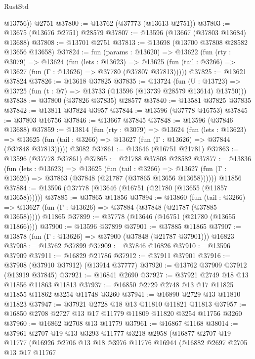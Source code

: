 \begin{lexlean}{RustStd}
\begin{coremodule}
        @13756))
    @2751
@37800 := @13762 (@37773 (@13613 @2751))
@37803 := @13675 (@13676 @2751) @28579
@37807 := @13596 (@13667 (@37803 @13684) @13688)
@37808 := @13701 @2751
@37813 := @13698 (@13700 @37808 @28582 @13656 @13658)
@37824 := fun (params : @13620) =>
  @13622
    (fun (rty : @3079) =>
    @13624
      (fun (lets : @13623) =>
      @13625 (fun (tail : @3266) => @13627 (fun (Γ : @13626) => @37780 (@37807 @37813)))))
@37825 := @13621 @37824
@37826 := @13618 @37825
@37835 := @13724
    (fun (U : @13723) => @13725 (fun (t : @7) => @13733 (@13596 (@13739 @28579 @13614) @13750)))
@37838 := @37800 (@37826 @37835) @28577
@37840 := @13581 @37825 @37835
@37842 := @13811 @37824 @3957
@37844 := @13596 (@37778 @16753)
@37845 := @37803 @16756
@37846 := @13667 @37845
@37848 := @13596 (@37846 @13688)
@37859 := @13814
    (fun (rty : @3079) =>
    @13624
      (fun (lets : @13623) =>
      @13625 (fun (tail : @3266) => @13627 (fun (Γ : @13626) => @37844 (@37848 @37813)))))
    @3082
@37861 := @13646 (@16751 @21781)
@37863 := @13596 (@37778 @37861)
@37865 := @21788 @37808 @28582
@37877 := @13836
    (fun (lets : @13623) =>
    @13625
      (fun (tail : @3266) =>
      @13627 (fun (Γ : @13626) => @37863 (@37848 (@21787 (@37865 @13656 @13658))))))
    @11856
@37884 := @13596 (@37778 (@13646 (@16751 (@21780 (@13655 (@11857 @13658))))))
@37885 := @37865 @11856
@37894 := @13860
    (fun (tail : @3266) => @13627 (fun (Γ : @13626) => @37884 (@37848 (@21787 (@37885 @13658)))))
    @11865
@37899 := @37778 (@13646 (@16751 (@21780 (@13655 @11866))))
@37900 := @13596 @37899
@37901 := @37885 @11865
@37907 := @13878 (fun (Γ : @13626) => @37900 (@37848 (@21787 @37901))) @16823
@37908 := @13762 @37899
@37909 := @37846 @16826
@37910 := @13596 @37909
@37911 := @16829 @21786
@37912 := @37911 @37901
@37916 := @37908 (@37910 @37912) (@13914 @37777)
@37920 := @13762 @37909 @37912 (@13919 @37845)
@37921 := @16841 @2690
@37927 := @37921 @2749 @18 @13 @11856 @11863 @11813
@37937 := @16850 @2729 @2748 @13 @17 @11825 @11855 @11862 @3254 @11748 @3260
@37941 := @16890 @2729 @13 @11810 @11823
@37947 := @37921 @2728 @18 @13 @11810 @11821 @11813
@37957 := @16850 @2708 @2727 @13 @17 @11779 @11809 @11820 @3254 @11756 @3260
@37960 := @16862 @2708 @13 @11779
@37961 := @16867 @1168
@38014 := @37961
    @2707
    @19
    @13
    @3293
    @11777
    @3218
    @2958
    (@16877
      @2707
      @19
      @11777
      (@16926
        @2706
        @13
        @18
        @3976
        @11776
        @16944
        (@16882
          @2697
          @2705
          @13
          @17
          @11767

\end{coremodule}
\end{lexlean}
